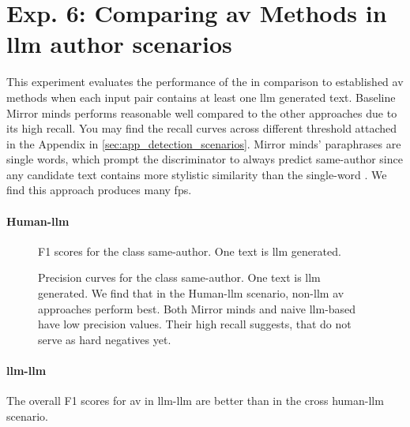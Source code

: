 \section{Exp. 6: Comparing \ac{av} Methods in \acs{llm} author scenarios}

This experiment evaluates the performance of the \impAppr{} in comparison to established \ac{av} methods when each input pair contains at least one \ac{llm} generated text.
Baseline Mirror minds performs reasonable well compared to the other approaches due to its high recall.
You may find the recall curves across different threshold attached in the Appendix in \autoref{sec:app_detection_scenarios}.
Mirror minds' paraphrases are single words, which prompt the discriminator to always predict same-author since any candidate text contains more stylistic similarity than the single-word \imps{}.
We find this approach produces many \acp{fp}.


\paragraph{Human-\ac{llm}}

  \begin{figure}[b]
    \centering
    
    \caption{F1 scores for the class same-author.
  One text is \ac{llm} generated.}
    \label{fig:human-llm_f1}
  \end{figure}

  \begin{figure}[b]
    
  \caption{Precision curves for the class same-author. 
  One text is \ac{llm} generated.
  We find that in the Human-\ac{llm} scenario, non-\ac{llm} \ac{av} approaches perform best. 
  Both Mirror minds and naive \ac{llm}-based have low precision values.
  Their high recall suggests, that \imps{} do not serve as hard negatives yet.}
  \label{fig:human-llm_prec}
\end{figure}


\paragraph{\ac{llm}-\ac{llm}}
The overall F1 scores for \ac{av} in \ac{llm}-\ac{llm} are better than in the cross human-\ac{llm} scenario.


